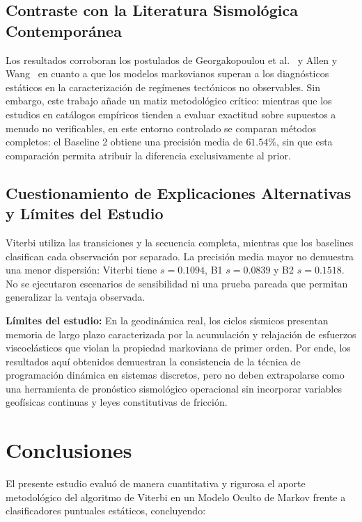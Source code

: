\documentclass[11pt,a4paper]{article}
\begin{document}
\subsection{Contraste con la Literatura Sismológica Contemporánea}

Los resultados corroboran los postulados de Georgakopoulou et al.~\cite{georgakopoulou2024seismic} y Allen y Wang~\cite{allen2023hidden} en cuanto a que los modelos markovianos superan a los diagnósticos estáticos en la caracterización de regímenes tectónicos no observables. Sin embargo, este trabajo añade un matiz metodológico crítico: mientras que los estudios en catálogos empíricos tienden a evaluar exactitud sobre supuestos a menudo no verificables, en este entorno controlado se comparan métodos completos: el Baseline 2 obtiene una precisión media de $61.54\%$, sin que esta comparación permita atribuir la diferencia exclusivamente al prior.

\subsection{Cuestionamiento de Explicaciones Alternativas y Límites del Estudio}

Viterbi utiliza las transiciones y la secuencia completa, mientras que los baselines clasifican cada observación por separado. La precisión media mayor no demuestra una menor dispersión: Viterbi tiene $s=0.1094$, B1 $s=0.0839$ y B2 $s=0.1518$. No se ejecutaron escenarios de sensibilidad ni una prueba pareada que permitan generalizar la ventaja observada.

\noindent \textbf{Límites del estudio:} En la geodinámica real, los ciclos sísmicos presentan memoria de largo plazo caracterizada por la acumulación y relajación de esfuerzos viscoelásticos que violan la propiedad markoviana de primer orden. Por ende, los resultados aquí obtenidos demuestran la consistencia de la técnica de programación dinámica en sistemas discretos, pero no deben extrapolarse como una herramienta de pronóstico sismológico operacional sin incorporar variables geofísicas continuas y leyes constitutivas de fricción.

\section{Conclusiones}

El presente estudio evaluó de manera cuantitativa y rigurosa el aporte metodológico del algoritmo de Viterbi en un Modelo Oculto de Markov frente a clasificadores puntuales estáticos, concluyendo:
\end{document}

